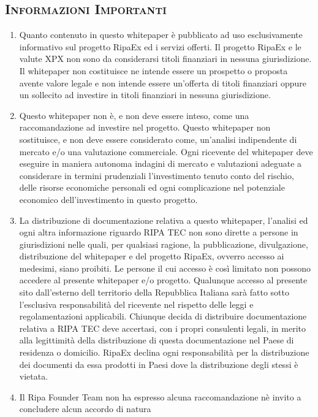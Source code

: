 \begin{scriptsize}
{		\section{\textsc{Informazioni Importanti}}
		\begin{enumerate}
			\item Quanto contenuto in questo whitepaper è pubblicato ad uso esclusivamente informativo sul progetto RipaEx 
			ed i servizi offerti. Il progetto RipaEx e le valute XPX non sono da considerarsi titoli finanziari in nessuna 
			giurisdizione. Il whitepaper non costituisce ne intende essere un prospetto o proposta 
			avente valore legale e non intende essere un'offerta di titoli finanziari oppure un sollecito ad investire 
			in titoli finanziari in nessuna giurisdizione.
			\item Questo whitepaper non è, e non deve essere inteso, come una raccomandazione ad investire nel progetto. 
			Questo whitepaper non sostituisce, e non deve essere considerato come, un'analisi indipendente di mercato e/o 
			una valutazione commerciale. Ogni ricevente del whitepaper deve eseguire in maniera autonoma indagini di mercato e 
			valutazioni adeguate a considerare in termini prudenziali l'investimento tenuto conto del rischio, 
			delle risorse economiche personali ed ogni complicazione nel potenziale economico dell'investimento in questo progetto.
			\item La distribuzione di documentazione relativa a questo whitepaper, l'analisi ed ogni altra 
			informazione riguardo RIPA TEC non sono dirette a persone in giurisdizioni nelle quali, per qualsiasi ragione, 
			la pubblicazione, divulgazione, distribuzione del whitepaper e del progetto RipaEx, ovverro accesso ai medesimi,
			siano proibiti. Le persone il cui accesso è così limitato non possono accedere al presente whitepaper e/o progetto.
			Qualunque accesso al presente sito dall'esterno dell territorio della Repubblica Italiana sarà fatto sotto l'esclusiva
			responsabilità del ricevente nel rispetto delle leggi e regolamentazioni applicabili.
			Chiunque decida di distribuire documentazione relativa a RIPA TEC deve accertasi, con i propri 
			consulenti legali, in merito alla legittimità della distribuzione di questa documentazione nel Paese di residenza 
			o domicilio. RipaEx declina ogni responsabilità per la distribuzione dei documenti da essa prodotti in Paesi dove 
			la distribuzione degli stessi è vietata. 
			\item Il Ripa Founder Team non ha espresso alcuna raccomandazione nè invito a concludere alcun accordo di natura

\end{enumerate}}
\end{scriptsize}
